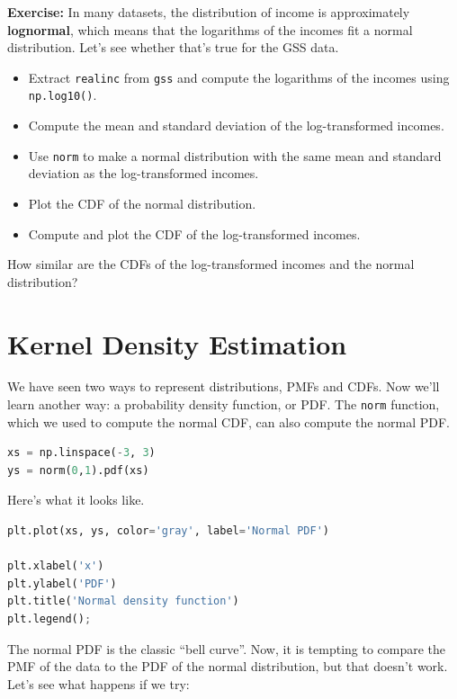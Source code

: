 \documentclass[
]{book}
\newcommand{\passthrough}[1]{#1}
\begin{document}
\textbf{Exercise:} In many datasets, the distribution of income is
approximately \textbf{lognormal}, which means that the logarithms of the
incomes fit a normal distribution. Let's see whether that's true for the
GSS data.

\begin{itemize}
\item
  Extract \passthrough{\lstinline!realinc!} from
  \passthrough{\lstinline!gss!} and compute the logarithms of the
  incomes using \passthrough{\lstinline!np.log10()!}.
\item
  Compute the mean and standard deviation of the log-transformed
  incomes.
\item
  Use \passthrough{\lstinline!norm!} to make a normal distribution with
  the same mean and standard deviation as the log-transformed incomes.
\item
  Plot the CDF of the normal distribution.
\item
  Compute and plot the CDF of the log-transformed incomes.
\end{itemize}

How similar are the CDFs of the log-transformed incomes and the normal
distribution?

\section{Kernel Density Estimation}\label{kernel-density-estimation}

We have seen two ways to represent distributions, PMFs and CDFs. Now
we'll learn another way: a probability density function, or PDF. The
\passthrough{\lstinline!norm!} function, which we used to compute the
normal CDF, can also compute the normal PDF.

\begin{lstlisting}[language=Python]
xs = np.linspace(-3, 3)
ys = norm(0,1).pdf(xs)
\end{lstlisting}

Here's what it looks like.

\begin{lstlisting}[language=Python]
plt.plot(xs, ys, color='gray', label='Normal PDF')

plt.xlabel('x')
plt.ylabel('PDF')
plt.title('Normal density function')
plt.legend();
\end{lstlisting}

The normal PDF is the classic ``bell curve''. Now, it is tempting to
compare the PMF of the data to the PDF of the normal distribution, but
that doesn't work. Let's see what happens if we try:
\end{document}

